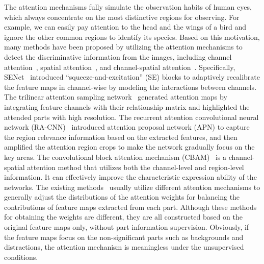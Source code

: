 \documentclass{article}
\begin{document}
The attention mechanisms fully simulate the observation habits of human eyes, which always concentrate on the most distinctive regions for observing. For example, we can easily pay attention to the head and the wings of a bird and ignore the other common regions to identify its species. Based on this motivation, many methods have been proposed by utilizing the attention mechanisms to detect the discriminative information from the images, including channel attention~\cite{TASN,SENet}, spatial attention~\cite{RA-CNN,PA-CNN}, and channel-spatial attention~\cite{CBAM}. Specifically, SENet~\cite{SENet} introduced ``squeeze-and-excitation'' (SE) blocks to adaptively recalibrate the feature maps in channel-wise by modeling the interactions between channels. The trilinear attention sampling network~\cite{TASN}  generated attention maps by integrating feature channels with their relationship matrix and highlighted the attended parts with high resolution.  The recurrent attention convolutional neural network (RA-CNN)~\cite{RA-CNN} introduced attention proposal network (APN) to capture the region relevance information based on the extracted features, and then amplified the attention region crops to make the network gradually focus on the key areas. The convolutional block attention mechanism (CBAM)~\cite{CBAM} is a channel-spatial attention method that utilizes both the channel-level and region-level information. It can effectively improve the characteristic expression ability of the networks. The existing methods~\cite{TASN,SENet,RA-CNN,CBAM} usually utilize different attention mechanisms to generally adjust the distributions of the attention weights for balancing the contributions of feature maps extracted from each 
part. Although these methods for obtaining the weights are different, they are all constructed based on the original feature maps only, without part information  supervision. Obviously, if the feature maps focus on the non-significant parts such as backgrounds and distractions, the attention mechanism is meaningless under the unsupervised conditions. 
\end{document}
